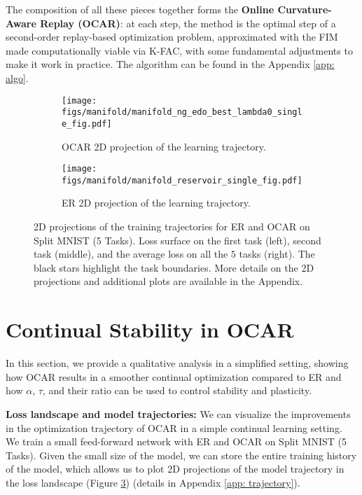 The composition of all these pieces together forms the \textbf{Online Curvature-Aware Replay (OCAR)}: at each step, the method is the optimal step of a second-order replay-based optimization problem, approximated with the FIM made computationally viable via K-FAC, with some fundamental adjustments to make it work in practice. The algorithm can be found in the Appendix \ref{app: algo}. 


\begin{figure}[t]
    \centering
    \begin{subfigure}[t]{0.95\textwidth}
        \centering
        \texttt{[image: figs/manifold/manifold\_ng\_edo\_best\_lambda0\_single\_fig.pdf]}
        \caption{OCAR 2D projection of the learning trajectory.}\label{fig:proj_car}       
    \end{subfigure}
    \begin{subfigure}[t]{0.95\textwidth}
        \centering
        \texttt{[image: figs/manifold/manifold\_reservoir\_single\_fig.pdf]}
        \caption{ER 2D projection of the learning trajectory.}\label{fig:proj_er}       
    \end{subfigure}
    \caption{2D projections of the training trajectories for ER and OCAR on Split MNIST (5 Tasks). Loss surface on the first task (left), second task (middle), and the average loss on all the $5$ tasks (right). The black stars highlight the task boundaries. More details on the 2D projections and additional plots are available in the Appendix.}\label{fig:traj}
\end{figure}



\section{Continual Stability in OCAR}\label{sec:car_stability}

In this section, we provide a qualitative analysis in a simplified setting, showing how OCAR results in a smoother continual optimization compared to ER and how $\alpha$, $\tau$, and their ratio can be used to control stability and plasticity.

\textbf{Loss landscape and model trajectories:} We can visualize the improvements in the optimization trajectory of OCAR in a simple continual learning setting. We train a small feed-forward network with ER and OCAR on Split MNIST (5 Tasks). Given the small size of the model, we can store the entire training history of the model, which allows us to plot 2D projections of the model trajectory in the loss landscape (Figure \ref{fig:traj}) (details in Appendix \ref{app: trajectory}).

